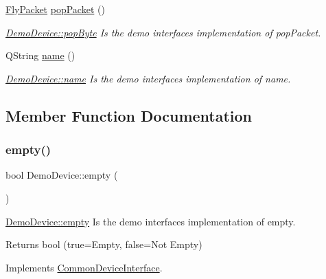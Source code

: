 \begin{DoxyCompactItemize}
\hyperlink{class_fly_packet}{Fly\+Packet} \hyperlink{class_demo_device_a6e755f50f52301b9166e278fe6851e88}{pop\+Packet} ()
\begin{DoxyCompactList}\small\item\em \hyperlink{class_demo_device_a788dd7e426fab9c8d19ea9fd106260d4}{Demo\+Device\+::pop\+Byte} Is the demo interface\textquotesingle{}s implementation of pop\+Packet. \end{DoxyCompactList}\item 
Q\+String \hyperlink{class_demo_device_acde538bd5a71a8d4df6293876169545c}{name} ()
\begin{DoxyCompactList}\small\item\em \hyperlink{class_demo_device_acde538bd5a71a8d4df6293876169545c}{Demo\+Device\+::name} Is the demo interface\textquotesingle{}s implementation of name. \end{DoxyCompactList}\end{DoxyCompactItemize}


\subsection{Member Function Documentation}
\hypertarget{class_demo_device_a52de363ec31fdbb540cf7cae6f584d22}{}\label{class_demo_device_a52de363ec31fdbb540cf7cae6f584d22} 
\subsubsection{\texorpdfstring{empty()}{empty()}}
{\footnotesize\ttfamily bool Demo\+Device\+::empty (\begin{DoxyParamCaption}{ }\end{DoxyParamCaption})\hspace{0.3cm}{\ttfamily [virtual]}}



\hyperlink{class_demo_device_a52de363ec31fdbb540cf7cae6f584d22}{Demo\+Device\+::empty} Is the demo interface\textquotesingle{}s implementation of empty. 

\begin{DoxyReturn}{Returns}
bool (true=Empty, false=Not Empty) 
\end{DoxyReturn}


Implements \hyperlink{class_common_device_interface}{Common\+Device\+Interface}.

\hypertarget{class_demo_device_aaadb9ced56699af55526b9fc7cf8420c}{}\label{class_demo_device_aaadb9ced56699af55526b9fc7cf8420c} 
